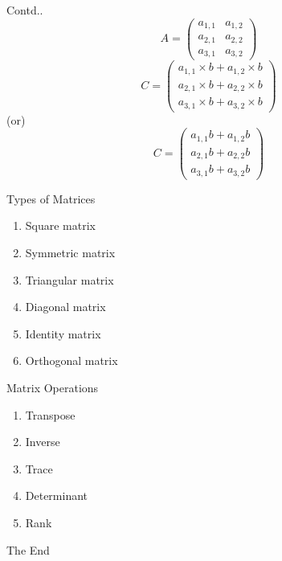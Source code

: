 \documentclass{beamer}
\begin{document}
\begin{frame}
\begin{block}{Contd..}
	\begin{equation*}
   		A = \begin{pmatrix}
   				a_{1,1} & a_{1,2} \\
   				a_{2,1} & a_{2,2} \\
   				a_{3,1} & a_{3,2} 
   			\end{pmatrix}
   	\end{equation*}
   	\begin{equation*}
   		C = \begin{pmatrix}
   				a_{1,1} \times b + a_{1,2} \times b \\
    			a_{2,1} \times b + a_{2,2} \times b \\
    			a_{3,1} \times b + a_{3,2} \times b
   			\end{pmatrix}
   	\end{equation*}
   	(or)
   	\begin{equation*}
   		C = \begin{pmatrix}
   				a_{1,1}b + a_{1,2}b \\
    			a_{2,1}b + a_{2,2}b \\
    			a_{3,1}b + a_{3,2}b
   			\end{pmatrix}
   	\end{equation*}
\end{block}
\end{frame}

\begin{frame}{Types of Matrices}
	\begin{enumerate}
		\item Square matrix
		\item Symmetric matrix
		\item Triangular matrix
		\item Diagonal matrix
		\item Identity matrix
		\item Orthogonal matrix
	\end{enumerate}
\end{frame}

\begin{frame}{Matrix Operations}
	\begin{enumerate}
		\item Transpose
		\item Inverse
		\item Trace
		\item Determinant
		\item Rank
	\end{enumerate}
\end{frame}
\begin{frame}
\huge{\centerline{The End}}
\end{frame}
\end{document}
